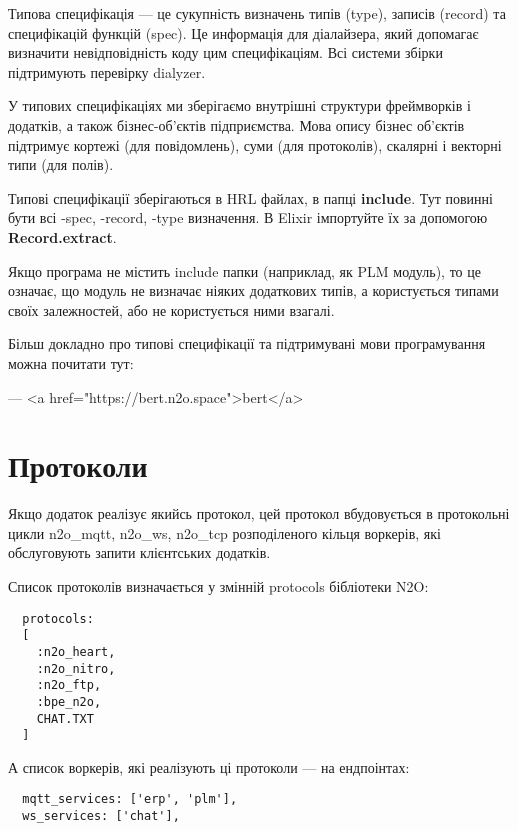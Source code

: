         Типова специфікація — це сукупність визначень типів (type),
           записів (record) та специфікацій функцій (spec). Це информація для діалайзера,
           який допомагає визначити невідповідність коду цим специфікаціям. Всі системи
           збірки підтримують перевірку dialyzer.

        У типових специфікаціях ми зберігаємо внутрішні структури
           фреймворків і додатків, а також бізнес-об'єктів підприємства.
           Мова опису бізнес об'єктів підтримує кортежі (для повідомлень),
           суми (для протоколів), скалярні і векторні типи (для полів).

        Типові специфікації зберігаються в HRL файлах, в папці \textbf{include}.
           Тут повинні бути всі -spec, -record, -type визначення. В Elixir
           імпортуйте їх за допомогою \textbf{Record.extract}.

        Якщо програма не містить include папки (наприклад, як PLM модуль),
           то це означає, що модуль не визначає ніяких додаткових типів,
           а користується типами своїх залежностей, або не користується ними взагалі.

        Більш докладно про типові специфікації та підтримувані мови програмування
           можна почитати тут:

        — <a href="https://bert.n2o.space">bert</a>

        \section{Протоколи}

        Якщо додаток реалізує якийсь протокол, цей протокол вбудовується
           в протокольні цикли n2o_mqtt, n2o_ws, n2o_tcp розподіленого кільця воркерів,
           які обслуговують запити клієнтських додатків.

        Список протоколів визначається у змінній protocols бібліотеки N2O:

        \begin{lstlisting}
  protocols:
  [
    :n2o_heart,
    :n2o_nitro,
    :n2o_ftp,
    :bpe_n2o,
    CHAT.TXT
  ]
        \end{lstlisting}

        А список воркерів, які реалізують ці протоколи — на ендпоінтах:

        \begin{lstlisting}
  mqtt_services: ['erp', 'plm'],
  ws_services: ['chat'],
        \end{lstlisting}


